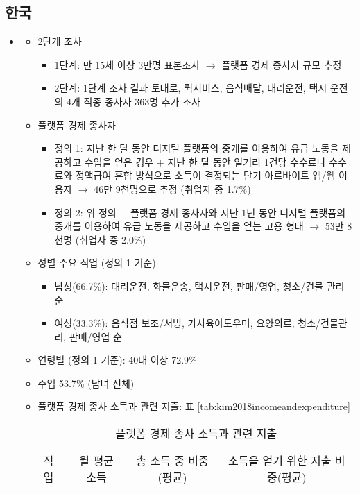 \subsection{한국}
\begin{itemize}
\item \cite{gimjun-yeong-gwonhyeja-choegiseong-yeonbola-bagbigon:2018aa}
	\begin{itemize}
	\item 2단계 조사
		\begin{itemize}
		\item 1단계: 만 15세 이상 3만명 표본조사 $\rightarrow$ 플랫폼 경제 종사자 규모 추정
		\item 2단계: 1단계 조사 결과 토대로, 퀵서비스, 음식배달, 대리운전, 택시 운전의 4개 직종 종사자 363명 추가 조사
		\end{itemize}
	\item 플랫폼 경제 종사자
		\begin{itemize}
		\item 정의 1: 지난 한 달 동안 디지털 플랫폼의 중개를 이용하여 유급 노동을 제공하고 수입을 얻은 경우 $+$ 지난 한 달 동안 일거리 1건당 수수료나 수수료와 정액급여 혼합 방식으로 소득이 결정되는 단기 아르바이트 앱/웹 이용자 $\rightarrow$ 46만 9천명으로 추정 (취업자 중 1.7\%)
		\item 정의 2: 위 정의 $+$ 플랫폼 경제 종사자와 지난 1년 동안 디지털 플랫폼의 중개를 이용하여 유급 노동을 제공하고 수입을 얻는 고용 형태 $\rightarrow$ 53만 8천명 (취업자 중 2.0\%)
		\end{itemize}
	\item 성별 주요 직업 (정의 1 기준)
		\begin{itemize}
		\item 남성(66.7\%): 대리운전, 화물운송, 택시운전, 판매/영업, 청소/건물 관리 순
		\item 여성(33.3\%): 음식점 보조/서빙, 가사육아도우미, 요양의료, 청소/건물관리, 판매/영업 순
		\end{itemize}	
	\item 연령별 (정의 1 기준): 40대 이상 	72.9\%
	\item 주업 53.7\% (남녀 전체)
	\item 플랫폼 경제 종사 소득과 관련 지출: 표 \ref{tab:kim2018incomeandexpenditure}
		\begin{table}[htp]
		\caption{플랫폼 경제 종사 소득과 관련 지출}
		\begin{center}
		\begin{tabular}{lccc}
		\toprule
		 직업 & 월 평균 소득 & 총 소득 중 비중(평균) & 소득을 얻기 위한 지출 비중(평균) \\

\end{tabular}
\end{center}
\end{table}
\end{itemize}
\end{itemize}
